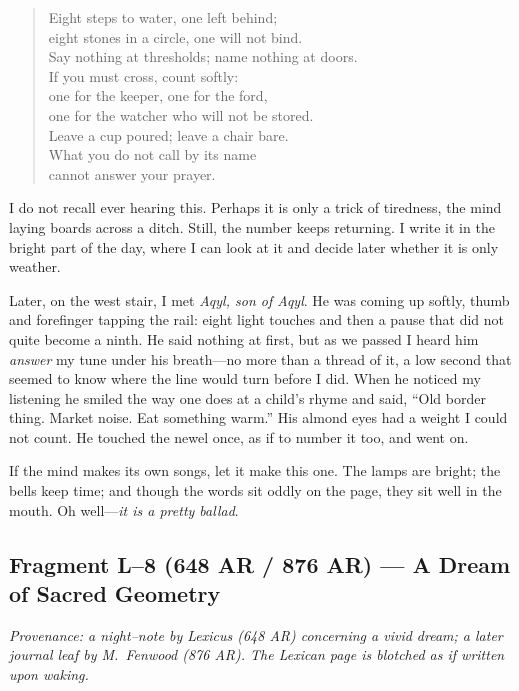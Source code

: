 \documentclass[11pt]{article}
\begin{document}
\begin{verse}
Eight steps to water, one left behind;\\
eight stones in a circle, one will not bind.\\
Say nothing at thresholds; name nothing at doors.\\
If you must cross, count softly:\\
one for the keeper, one for the ford,\\
one for the watcher who will not be stored.\\
Leave a cup poured; leave a chair bare.\\
What you do not call by its name\\
cannot answer your prayer.
\end{verse}

I do not recall ever hearing this. Perhaps it is only a trick of tiredness, the mind laying boards across a ditch. Still, the number keeps returning. I write it in the bright part of the day, where I can look at it and decide later whether it is only weather.

Later, on the west stair, I met \textit{Aqyl, son of Aqyl}. He was coming up softly, thumb and forefinger tapping the rail: eight light touches and then a pause that did not quite become a ninth. He said nothing at first, but as we passed I heard him \emph{answer} my tune under his breath—no more than a thread of it, a low second that seemed to know where the line would turn before I did. When he noticed my listening he smiled the way one does at a child’s rhyme and said, “Old border thing. Market noise. Eat something warm.” His almond eyes had a weight I could not count. He touched the newel once, as if to number it too, and went on.

If the mind makes its own songs, let it make this one. The lamps are bright; the bells keep time; and though the words sit oddly on the page, they sit well in the mouth. Oh well—\emph{it is a pretty ballad}.

\subsection{Fragment L--8 (648 AR / 876 AR) — A Dream of Sacred Geometry}
\label{frag:l8}

\noindent\textit{Provenance: a night–note by Lexicus (648 AR) concerning a vivid dream; a later journal leaf by M.\ Fenwood (876 AR). The Lexican page is blotched as if written upon waking.}
\end{document}
